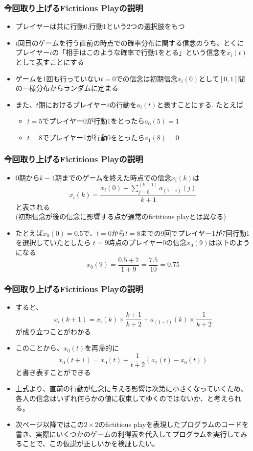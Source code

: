 \documentclass[dvipdfmx,fleqn,handout]{beamer}
\begin{document}
\begin{frame}
\frametitle{今回取り上げるFictitious Playの説明}
\begin{itemize}\setlength{\parskip}{0.5em}
\item
プレイヤーは共に行動0,行動1という2つの選択肢をもつ\pause
\item
$t$回目のゲームを行う直前の時点での確率分布に関する信念のうち、とくにプレイヤー$i$の「相手はこのような確率で行動1をとる」という信念を$x_i(t)$として表すことにする\pause
\item
ゲームを1回も行っていない$t=0$での信念は初期信念$x_i(0)$として$[0,1]$間の一様分布からランダムに定まる\pause
\item
また、$t$期におけるプレイヤー$i$の行動を$a_i(t)$と表すことにする. たとえば
\begin{itemize}\setlength{\parskip}{0.5em}
\item$t=5$でプレイヤー0が行動1をとったら$a_0(5)=1$
\item$t=8$でプレイヤー1が行動0をとったら$a_1(8)=0$
\end{itemize}
\end{itemize}
\end{frame}

\begin{frame}
\frametitle{今回取り上げるFictitious Playの説明}
\begin{itemize}\setlength{\parskip}{0.5em}
\item
$0$期から$k-1$期までのゲームを終えた時点での信念$x_i(k)$は
\[
x_i(k)=\frac{x_i(0)+\sum_{j=0}^{(k-1)} a_{(1-i)}(j)}{k+1}
\]
と表される\\
(初期信念が後の信念に影響する点が通常のfictitious playとは異なる)\pause
\item
たとえば$x_0(0)=0.5$で、$t=0$から$t=8$までの9回でプレイヤー1が7回行動1を選択していたとしたら
$t=9$時点のプレイヤー0の信念$x_0(9)$は以下のようになる
\[
x_0(9)=\frac{0.5+7}{1+9}=\frac{7.5}{10}=0.75
\]
\end{itemize}
\end{frame}

\begin{frame}
\frametitle{今回取り上げるFictitious Playの説明}
\begin{itemize}\setlength{\parskip}{0.5em}
\item
すると、
\[
x_i(k+1)=x_i(k)\times\frac{k+1}{k+2}+a_{(1-i)}(k)\times\frac{1}{k+2}
\]
が成り立つことがわかる\pause
\item
このことから、$x_0(t)$を再帰的に
\[
x_0(t+1)
= x_0(t) + \frac{1}{t+2} (a_1(t) - x_0(t))
\]
と書き表すことができる\pause
\item
上式より、直前の行動が信念に与える影響は次第に小さくなっていくため、各人の信念はいずれ何らかの値に収束してゆくのではないか、と考えられる。\pause
\item
次ページ以降ではこの$2\times2$のfictitious playを表現したプログラムのコードを書き、実際にいくつかのゲームの利得表を代入してプログラムを実行してみることで、この仮説が正しいかを検証したい。
\end{itemize}
\end{frame}
\end{document}
